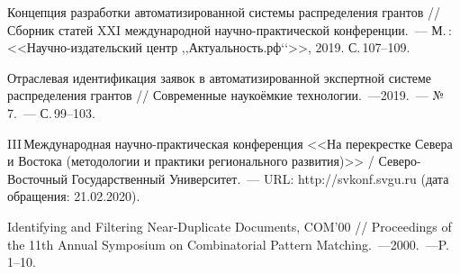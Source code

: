 \begin{thebibliography}{99}
\bibitem{} Концепция разработки автоматизированной системы распределения грантов // Сборник статей XXI международной научно-практической конференции.~--- М.\,: <<Научно-издательский центр ,,Актуальность.рф‘‘>>, 2019. С.\,107--109.

\bibitem{} Отраслевая идентификация заявок в автоматизированной экспертной системе распределения грантов // Современные наукоёмкие технологии.~---2019.~--- №\,7.~--- С.\,99--103.

\bibitem{}III\,Международная научно-практическая конференция <<На перекрестке Севера и Востока (методологии и практики регионального развития)>> / Северо-Восточный Государственный Университет.~--- URL: http://svkonf.svgu.ru (дата обращения: 21.02.2020).

\bibitem{} Identifying and Filtering Near-Duplicate Documents, COM’00 // Proceedings of the 11th Annual Symposium on Combinatorial Pattern Matching.~---2000.~---P.\,1--10.
\end{thebibliography}
\thispagestyle{empty}
